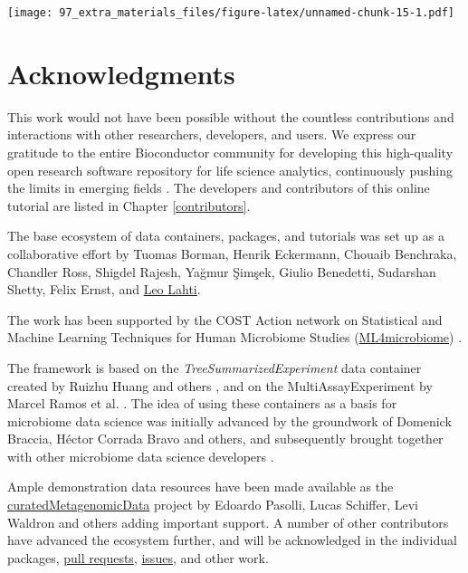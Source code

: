 \documentclass[
]{book}
\begin{document}
\texttt{[image: 97\_extra\_materials\_files/figure-latex/unnamed-chunk-15-1.pdf]}

\hypertarget{acknowledgments}{%
\chapter{Acknowledgments}\label{acknowledgments}}

This work would not have been possible without the countless
contributions and interactions with other researchers, developers, and
users. We express our gratitude to the entire Bioconductor community
for developing this high-quality open research software repository for
life science analytics, continuously pushing the limits in emerging
fields \citep[\citet{Huber2015}]{Gentleman2004}. The developers and contributors
of this online tutorial are listed in Chapter \ref{contributors}.

The base ecosystem of data containers, packages, and tutorials was set
up as a collaborative effort by Tuomas Borman, Henrik Eckermann,
Chouaib Benchraka, Chandler Ross, Shigdel Rajesh, Yağmur Şimşek,
Giulio Benedetti, Sudarshan Shetty, Felix Ernst, and \href{http://www.iki.fi/Leo.Lahti}{Leo
Lahti}.

The work has been supported by the COST Action network on Statistical
and Machine Learning Techniques for Human Microbiome Studies
(\href{https://www.ml4microbiome.eu/}{ML4microbiome}) \citep{MorenoIndias2021}.

The framework is based on the \emph{TreeSummarizedExperiment} data
container created by Ruizhu Huang and others
\citep{R-TreeSummarizedExperiment}, and on the MultiAssayExperiment by
Marcel Ramos et al. \citep{Ramos2017}. The idea of using these containers
as a basis for microbiome data science was initially advanced by the
groundwork of Domenick Braccia, Héctor Corrada Bravo and others, and
subsequently brought together with other microbiome data science
developers \citep{Shetty2019}.

Ample demonstration data resources have been made available as the
\href{https://waldronlab.io/curatedMetagenomicData/}{curatedMetagenomicData}
project by Edoardo Pasolli, Lucas Schiffer, Levi Waldron and others
\citep{Pasolli2017} adding important support.
A number of other contributors have advanced the ecosystem
further, and will be acknowledged in the individual
packages, \href{https://github.com/microbiome/OMA/graphs/contributors}{pull
requests},
\href{https://github.com/microbiome/OMA/issues}{issues}, and other work.
\end{document}
